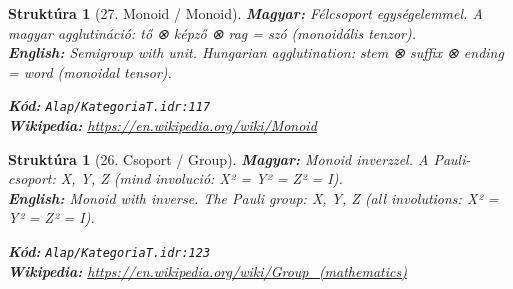 \documentclass[11pt,a4paper,twocolumn]{article}
\newtheorem{struktura}[tetel]{Struktúra}
\begin{document}
\begin{struktura}[27. Monoid / Monoid]

\textbf{Magyar:} Félcsoport egységelemmel. A magyar agglutináció: tő ⊗ képző ⊗ rag = szó (monoidális tenzor).\\

\textbf{English:} Semigroup with unit. Hungarian agglutination: stem ⊗ suffix ⊗ ending = word (monoidal tensor).\\

\begin{center}
\end{center}

\textbf{Kód:} \texttt{Alap/KategoriaT.idr:117}\\
\textbf{Wikipedia:} \url{https://en.wikipedia.org/wiki/Monoid}

\end{struktura}

\vspace{0.5cm}

\begin{struktura}[26. Csoport / Group]

\textbf{Magyar:} Monoid inverzzel. A Pauli-csoport: X, Y, Z (mind involució: X² = Y² = Z² = I).\\

\textbf{English:} Monoid with inverse. The Pauli group: X, Y, Z (all involutions: X² = Y² = Z² = I).\\

\begin{center}
\end{center}

\textbf{Kód:} \texttt{Alap/KategoriaT.idr:123}\\
\textbf{Wikipedia:} \url{https://en.wikipedia.org/wiki/Group_(mathematics)}

\end{struktura}

\vspace{0.5cm}
\end{document}
